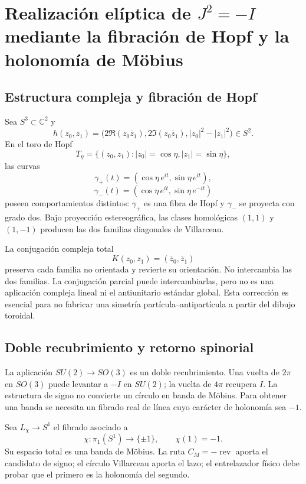 \section{Realización elíptica de \(J^2=-I\) mediante la fibración de Hopf y la holonomía de Möbius}

\subsection{Estructura compleja y fibración de Hopf}

Sea \(S^3\subset\mathbb C^2\) y
\[
h(z_0,z_1)=
\bigl(2\Re(z_0\overline z_1),
2\Im(z_0\overline z_1),|z_0|^2-|z_1|^2\bigr)
\in S^2.
\]
En el toro de Hopf
\[
T_\eta=\{(z_0,z_1):|z_0|=\cos\eta,
|z_1|=\sin\eta\},
\]
las curvas
\[
\gamma_+(t)=(\cos\eta\,e^{it},\sin\eta\,e^{it}),
\]
\[
\gamma_-(t)=(\cos\eta\,e^{it},\sin\eta\,e^{-it})
\]
poseen comportamientos distintos: \(\gamma_+\) es una fibra de Hopf y
\(\gamma_-\) se proyecta con grado dos. Bajo proyección estereográfica, las
clases homológicas \((1,1)\) y \((1,-1)\) producen las dos familias diagonales
de Villarceau.

La conjugación compleja total
\[
K(z_0,z_1)=(\overline z_0,\overline z_1)
\]
preserva cada familia no orientada y revierte su orientación. No intercambia
las dos familias. La conjugación parcial puede intercambiarlas, pero no es una
aplicación compleja lineal ni el antiunitario estándar global. Esta corrección
es esencial para no fabricar una simetría partícula--antipartícula a partir del
dibujo toroidal.

\subsection{Doble recubrimiento y retorno spinorial}

La aplicación \(SU(2)\to SO(3)\) es un doble recubrimiento. Una vuelta de
\(2\pi\) en \(SO(3)\) puede levantar a \(-I\) en \(SU(2)\); la vuelta de
\(4\pi\) recupera \(I\). La estructura de signo no convierte un círculo en
banda de Möbius. Para obtener una banda se necesita un fibrado real de línea
cuyo carácter de holonomía sea \(-1\).

Sea \(L_\chi\to S^1\) el fibrado asociado a
\[
\chi:\pi_1(S^1)\longrightarrow\{\pm1\},
\qquad \chi(1)=-1.
\]
Su espacio total es una banda de Möbius. La ruta \(C_M=-\operatorname{rev}\)
aporta el candidato de signo; el círculo Villarceau aporta el lazo; el
entrelazador físico debe probar que el primero es la holonomía del segundo.

